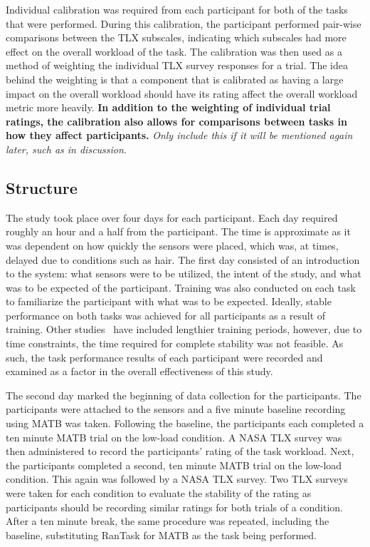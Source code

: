 \documentclass[11pt]{article}
\begin{document}
	Individual calibration was required from each participant for both of the tasks that were performed. During this calibration, the participant performed pair-wise comparisons between the TLX subscales, indicating which subscales had more effect on the overall workload of the task. The calibration was then used as a method of weighting the individual TLX survey responses for a trial. The idea behind the weighting is that a component that is calibrated as having a large impact on the overall workload should have its rating affect the overall workload metric more heavily. {\bf In addition to the weighting of individual trial ratings, the calibration also allows for comparisons between tasks in how they affect participants. }\emph{Only include this if it will be mentioned again later, such as in discussion.}
		
	\subsection{Structure} %
	The study took place over four days for each participant. Each day required roughly an hour and a half from the participant. The time is approximate as it was dependent on how quickly the sensors were placed, which was, at times, delayed due to conditions such as hair. The first day consisted of an introduction to the system: what sensors were to be utilized, the intent of the study, and what was to be expected of the participant. Training was also conducted on each task to familiarize the participant with what was to be expected. Ideally, stable performance on both tasks was achieved for all participants as a result of training. Other studies~\cite{Wilson} have included lengthier training periods, however, due to time constraints, the time required for complete stability was not feasible. 
	As such, the task performance results of each participant were recorded and examined as a factor in the overall effectiveness of this study. 
		
	The second day marked the beginning of data collection for the participants. The participants were attached to the sensors and a five minute baseline recording using MATB was taken. Following the baseline, the participants each completed a ten minute MATB trial on the low-load condition. A NASA TLX survey was then administered to record the participants' rating of the task workload. Next, the participants completed a second, ten minute MATB trial on the low-load condition. This again was followed by a NASA TLX survey. Two TLX surveys were taken for each condition to evaluate the stability of the rating as participants should be recording similar ratings for both trials of a condition. After a ten minute break, the same procedure was repeated, including the baseline, substituting RanTask for MATB as the task being performed.
	
\end{document}
